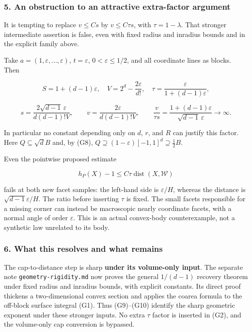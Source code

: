 \documentclass[
  11pt,
]{article}
\begin{document}
\subsubsection{5. An obstruction to an attractive extra-factor
argument}\label{an-obstruction-to-an-attractive-extra-factor-argument}

It is tempting to replace \(v\le C s\) by \(v\le C\tau s\), with
\(\tau=1-\lambda\). That stronger intermediate assertion is false, even
with fixed radius and inradius bounds and in the explicit family above.

Take \(a=(1,\varepsilon,\ldots,\varepsilon)\), \(t=\varepsilon\),
\(0<\varepsilon\le1/2\), and all coordinate lines as blocks. Then

\[
S=1+(d-1)\varepsilon,\quad
V=2^d-\frac{2\varepsilon}{d!},\quad
\tau=\frac{\varepsilon}{1+(d-1)\varepsilon},
\]

\[
s=\frac{2\sqrt{d-1}\,\varepsilon}{d(d-1)!V},\qquad
v=\frac{2\varepsilon}{d(d-1)!V},\qquad
\frac{v}{\tau s}
=\frac{1+(d-1)\varepsilon}{\sqrt{d-1}\,\varepsilon}
\longrightarrow\infty.                                  \tag{G12}
\]

In particular no constant depending only on \(d\), \(r\), and \(R\) can
justify this factor. Here \(Q\subseteq\sqrt d B\) and, by (G8),
\(Q\supseteq(1-\varepsilon)[-1,1]^d\supseteq\tfrac12 B\).

Even the pointwise proposed estimate

\[
h_P(X)-1\le C\tau\operatorname{dist}(X,\mathcal W)
\]

fails at both new facet samples: the left-hand side is
\(\varepsilon/H\), whereas the distance is \(\sqrt{d-1}\varepsilon/H\).
The ratio before inserting \(\tau\) is fixed. The small facets
responsible for a missing corner can instead be macroscopic nearly
coordinate facets, with a normal angle of order \(\varepsilon\). This is
an actual convex-body counterexample, not a synthetic law unrelated to
its body.

\subsubsection{6. What this resolves and what
remains}\label{what-this-resolves-and-what-remains}

The cap-to-distance step is sharp \textbf{under its volume-only input}.
The separate note \texttt{geometry-rigidity.md} now proves the general
\(1/(d-1)\) recovery theorem under fixed radius and inradius bounds,
with explicit constants. Its direct proof thickens a two-dimensional
convex section and applies the coarea formula to the off-block surface
integral (G1). Thus (G9)--(G10) identify the sharp geometric exponent
under these stronger inputs. No extra \(\tau\) factor is inserted in
(G2), and the volume-only cap conversion is bypassed.
\end{document}
